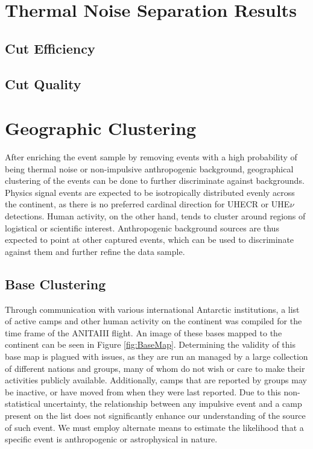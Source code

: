 \section{Thermal Noise Separation Results}
	\subsection{Cut Efficiency}
	\subsection{Cut Quality}




\section{Geographic Clustering}
	After enriching the event sample by removing events with a high probability of being thermal noise or non-impulsive anthropogenic background, geographical clustering of the events can be done to further discriminate against backgrounds. Physics signal events are expected to be isotropically distributed evenly across the continent, as there is no preferred cardinal direction for UHECR or UHE$\nu$ detections.  Human activity, on the other hand, tends to cluster around regions of logistical or scientific interest.  Anthropogenic background sources are thus expected to point at other captured events, which can be used to discriminate against them and further refine the data sample. 

	\subsection{Base Clustering}
		Through communication with various international Antarctic institutions, a list of active camps and other human activity on the continent was compiled for the time frame of the ANITAIII flight.  An image of these bases mapped to the continent can be seen in Figure \ref{fig:BaseMap}.  Determining the validity of this base map is plagued with issues, as they are run an managed by a large collection of different nations and groups, many of whom do not wish or care to make their activities publicly available.  Additionally, camps that are reported by groups may be inactive, or have moved from when they were last reported.  Due to this non-statistical uncertainty, the relationship between any impulsive event and a camp present on the list does not significantly enhance our understanding of the source of such event.  We must employ alternate means to estimate the likelihood that a specific event is anthropogenic or astrophysical in nature.
		
